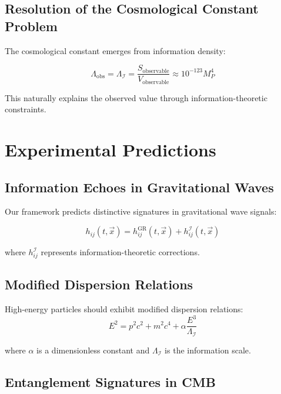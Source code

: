 \documentclass{article}
\begin{document}
\subsection{Resolution of the Cosmological Constant Problem}

The cosmological constant emerges from information density:

\begin{equation}
\Lambda_{\text{obs}} = \Lambda_{\mathcal{I}} = \frac{S_{\text{observable}}}{V_{\text{observable}}} \approx 10^{-123} M_P^4
\end{equation}

This naturally explains the observed value through information-theoretic constraints.

\section{Experimental Predictions}

\subsection{Information Echoes in Gravitational Waves}

Our framework predicts distinctive signatures in gravitational wave signals:

\begin{equation}
h_{ij}(t, \vec{x}) = h_{ij}^{\text{GR}}(t, \vec{x}) + h_{ij}^{\mathcal{I}}(t, \vec{x})
\end{equation}

where $h_{ij}^{\mathcal{I}}$ represents information-theoretic corrections.

\subsection{Modified Dispersion Relations}

High-energy particles should exhibit modified dispersion relations:
\begin{equation}
E^2 = p^2 c^2 + m^2 c^4 + \alpha \frac{E^3}{\Lambda_{\mathcal{I}}}
\end{equation}

where $\alpha$ is a dimensionless constant and $\Lambda_{\mathcal{I}}$ is the information scale.

\subsection{Entanglement Signatures in CMB}
\end{document}
